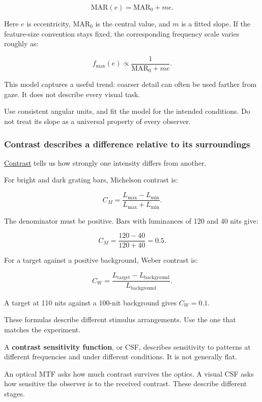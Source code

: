 \[
\mathrm{MAR}(e)=\mathrm{MAR}_0+me.
\]

Here \(e\) is eccentricity, \(\mathrm{MAR}_0\) is the central value, and \(m\) is a fitted slope. If the feature-size convention stays fixed, the corresponding frequency scale varies roughly as:

\[
f_{\max}(e)\propto\frac1{\mathrm{MAR}_0+me}.
\]

This model captures a useful trend: coarser detail can often be used farther from gaze. It does not describe every visual task.

Use consistent angular units, and fit the model for the intended conditions. Do not treat its slope as a universal property of every observer.

\subsubsection{Contrast describes a difference relative to its surroundings}\label{04-visual-computing-ii-ch043-contrast-describes-a-difference-relative-to-its-surroundings}

\hypertarget{04-visual-computing-ii-ch043-contrast-describes-a-difference-relative-to-its-surroundings}{}

\hyperref[appendix-b3aa9e8e01ad]{Contrast} tells us how strongly one intensity differs from another.

For bright and dark grating bars, Michelson contrast is:

\[
C_M=\frac{L_{\max}-L_{\min}}{L_{\max}+L_{\min}}.
\]

The denominator must be positive. Bars with luminances of 120 and 40 nits give:

\[
C_M=\frac{120-40}{120+40}=0.5.
\]

For a target against a positive background, Weber contrast is:

\[
C_W=\frac{L_{\mathrm{target}}-L_{\mathrm{background}}}
{L_{\mathrm{background}}}.
\]

A target at 110 nits against a 100-nit background gives \(C_W=0.1\).

These formulas describe different stimulus arrangements. Use the one that matches the experiment.

A \textbf{contrast sensitivity function}, or CSF, describes sensitivity to patterns at different frequencies and under different conditions. It is not generally flat.

An optical MTF asks how much contrast survives the optics. A visual CSF asks how sensitive the observer is to the received contrast. These describe different stages.

